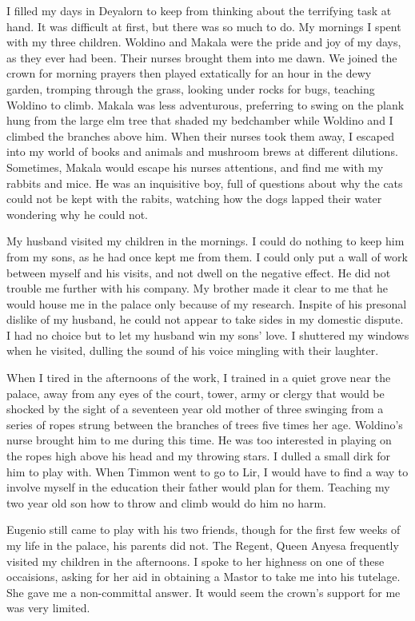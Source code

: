 \documentclass{article}
\begin{document}
I filled my days in Deyalorn to keep from thinking about the terrifying task at hand. It was difficult at first, but there was so much to do. My mornings I spent with my three children. Woldino and Makala were the pride and joy of my days, as they ever had been. Their nurses brought them into me dawn. We joined the crown for morning prayers then played extatically for an hour in the dewy garden, tromping through the grass, looking under rocks for bugs, teaching Woldino to climb. Makala was less adventurous, preferring to swing on the plank hung from the large elm tree that shaded my bedchamber while Woldino and I climbed the branches above him. When their nurses took them away, I escaped into my world of books and animals and mushroom brews at different dilutions. Sometimes, Makala would escape his nurses attentions, and find me with my rabbits and mice. He was an inquisitive boy, full of questions about why the cats could not be kept with the rabits, watching how the dogs lapped their water wondering why he could not. 

My husband visited my children in the mornings. I could do nothing to keep him from my sons, as he had once kept me from them. I could only put a wall of work between myself and his visits, and not dwell on the negative effect. He did not trouble me further with his company. My brother made it clear to me that he would house me in the palace only because of my research. Inspite of his presonal dislike of my husband, he could not appear to take sides in my domestic dispute. I had no choice but to let my husband win my sons' love. I shuttered my windows when he visited, dulling the sound of his voice mingling with their laughter.

When I tired in the afternoons of the work, I trained in a quiet grove near the palace, away from any eyes of the court, tower, army or clergy that would be shocked by the sight of a seventeen year old mother of three swinging from a series of ropes strung between the branches of trees five times her age. Woldino's nurse brought him to me during this time. He was too interested in playing on the ropes high above his head and my throwing stars. I dulled a small dirk for him to play with. When Timmon went to go to Lir, I would have to find a way to involve myself in the education their father would plan for them. Teaching my two year old son how to throw and climb would do him no harm.

Eugenio still came to play with his two friends, though for the first few weeks of my life in the palace, his parents did not. The Regent, Queen Anyesa frequently visited my children in the afternoons. I spoke to her highness on one of these occaisions, asking for her aid in obtaining a Mastor to take me into his tutelage. She gave me a non-committal answer. It would seem the crown's support for me was very limited.
\end{document}
